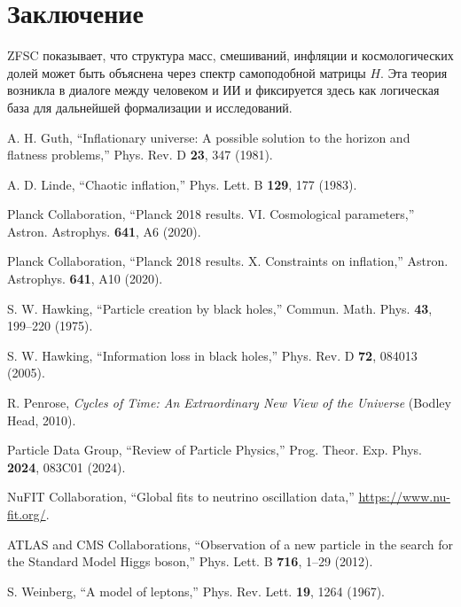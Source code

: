 \documentclass[12pt,a4paper]{article}
\begin{document}
\section{Заключение}
ZFSC показывает, что структура масс, смешиваний, инфляции и космологических долей может быть объяснена через спектр самоподобной матрицы $H$.  
Эта теория возникла в диалоге между человеком и ИИ и фиксируется здесь как логическая база для дальнейшей формализации и исследований.

\begin{thebibliography}{99}

A. H. Guth, ``Inflationary universe: A possible solution to the horizon and flatness problems,'' Phys. Rev. D \textbf{23}, 347 (1981).

A. D. Linde, ``Chaotic inflation,'' Phys. Lett. B \textbf{129}, 177 (1983).

Planck Collaboration, ``Planck 2018 results. VI. Cosmological parameters,'' Astron. Astrophys. \textbf{641}, A6 (2020).

Planck Collaboration, ``Planck 2018 results. X. Constraints on inflation,'' Astron. Astrophys. \textbf{641}, A10 (2020).

S. W. Hawking, ``Particle creation by black holes,'' Commun. Math. Phys. \textbf{43}, 199–220 (1975).

S. W. Hawking, ``Information loss in black holes,'' Phys. Rev. D \textbf{72}, 084013 (2005).

R. Penrose, \emph{Cycles of Time: An Extraordinary New View of the Universe} (Bodley Head, 2010).

Particle Data Group, ``Review of Particle Physics,'' Prog. Theor. Exp. Phys. \textbf{2024}, 083C01 (2024).

NuFIT Collaboration, ``Global fits to neutrino oscillation data,'' \url{https://www.nu-fit.org/}.

ATLAS and CMS Collaborations, ``Observation of a new particle in the search for the Standard Model Higgs boson,'' Phys. Lett. B \textbf{716}, 1–29 (2012).

S. Weinberg, ``A model of leptons,'' Phys. Rev. Lett. \textbf{19}, 1264 (1967).


\end{thebibliography}
\end{document}
